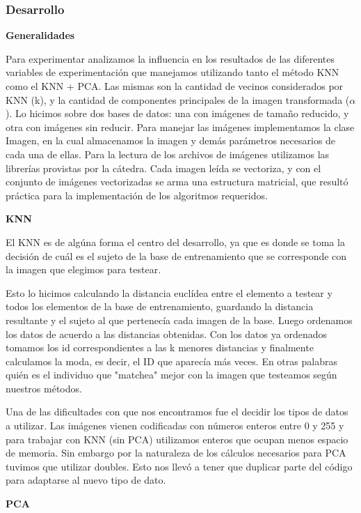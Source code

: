 \subsubsection*{Desarrollo}

\textbf{Generalidades}

Para experimentar analizamos la influencia en los resultados de las diferentes variables de experimentación que manejamos utilizando tanto el método KNN como el KNN + PCA. 
Las mismas son la cantidad de vecinos considerados por KNN (k), y la cantidad de componentes principales de la imagen transformada ($\alpha$).
Lo hicimos sobre dos bases de datos: una con im\'agenes de tamaño reducido, y otra con imágenes sin reducir.
Para manejar las imágenes implementamos la clase Imagen, en la cual almacenamos la imagen y demás parámetros necesarios de cada una de ellas.
Para la lectura de los archivos de imágenes utilizamos las librerías provistas por la cátedra.
Cada imagen leída se vectoriza, y con el conjunto de imágenes vectorizadas se arma una estructura matricial, que resultó práctica para la implementación de los algoritmos requeridos.

\textbf{KNN}

El KNN es de algúna forma el centro del desarrollo, ya que es donde se toma la decisión de cuál es el sujeto de la base de entrenamiento que se corresponde con la imagen que elegimos para testear.

Esto lo hicimos calculando la distancia euclídea entre el elemento a testear y todos los elementos de la base de entrenamiento, guardando la distancia resultante y el sujeto al que pertenecía cada imagen de la base. Luego ordenamos los datos de acuerdo a las distancias obtenidas. Con los datos ya ordenados tomamos los id correspondientes a las k menores distancias y finalmente calculamos la moda, es decir, el ID que  aparecía más veces. En otras palabras quién es el individuo que "matchea" mejor con la imagen que testeamos según nuestros métodos. 

\par Una de las dificultades con que nos encontramos fue el decidir los tipos de datos a utilizar. Las imágenes vienen codificadas con números enteros entre 0 y 255 y para trabajar con KNN (sin PCA) utilizamos enteros que ocupan menos espacio de memoria. Sin embargo por la naturaleza de los cálculos necesarios para PCA tuvimos que utilizar doubles. Esto nos llevó a tener que duplicar parte del código para adaptarse al nuevo tipo de dato.


\textbf{PCA}

